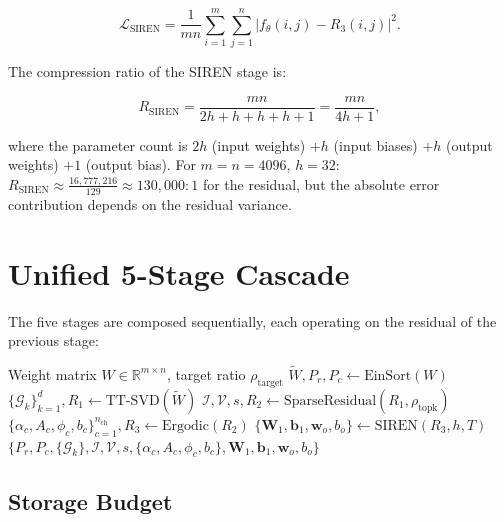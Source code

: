 \documentclass[11pt,a4paper]{article}
\begin{document}
\[
	\mathcal{L}_{\text{SIREN}} = \frac{1}{mn} \sum_{i=1}^m \sum_{j=1}^n |f_\theta(i, j) - R_3(i, j)|^2.
\]

The compression ratio of the SIREN stage is:

\[
	R_{\text{SIREN}} = \frac{mn}{2h + h + h + h + 1} = \frac{mn}{4h + 1},
\]

where the parameter count is $2h$ (input weights) $+ h$ (input biases) $+ h$ (output
weights) $+ 1$ (output bias). For $m=n=4096$, $h=32$: $R_{\text{SIREN}} \approx
	\frac{16,777,216}{129} \approx 130,000:1$ for the residual, but the absolute error
contribution depends on the residual variance.

\section{Unified 5-Stage Cascade}

The five stages are composed sequentially, each operating on the residual of the
previous stage:

\begin{algorithm}[H]
	\caption{FiveStageCascade Compression}
	\label{alg:cascade}
	\begin{algorithmic}[1]
		\Require Weight matrix $W \in \mathbb{R}^{m \times n}$, target ratio $\rho_{\text{target}}$
		\State $\tilde{W}, P_r, P_c \gets \text{EinSort}(W)$ 
		\State $\{\mathcal{G}_k\}_{k=1}^d, R_1 \gets \text{TT-SVD}(\tilde{W})$ 
		\State $\mathcal{I}, \mathcal{V}, s, R_2 \gets \text{SparseResidual}(R_1, \rho_{\text{topk}})$ 
		\State $\{\alpha_c, A_c, \phi_c, b_c\}_{c=1}^{n_{\text{ch}}}, R_3 \gets \text{Ergodic}(R_2)$ 
		\State $\{\mathbf{W}_1, \mathbf{b}_1, \mathbf{w}_o, b_o\} \gets \text{SIREN}(R_3, h, T)$ 
		\State \Return $\{P_r, P_c, \{\mathcal{G}_k\}, \mathcal{I}, \mathcal{V}, s, \{\alpha_c, A_c, \phi_c, b_c\}, \mathbf{W}_1, \mathbf{b}_1, \mathbf{w}_o, b_o\}$
	\end{algorithmic}
\end{algorithm}

\subsection{Storage Budget}
\end{document}
